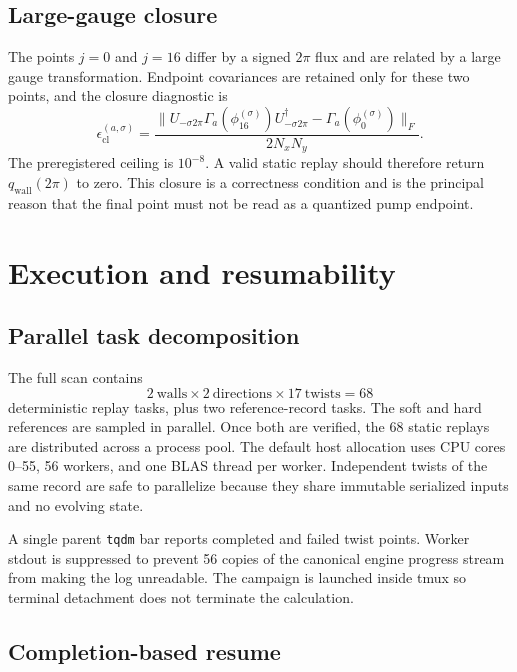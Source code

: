 \documentclass[aps,prb,twocolumn,floatfix,nofootinbib,superscriptaddress]{revtex4-2}
\newcommand{\code}[1]{\texttt{#1}}
\begin{document}
\subsection{Large-gauge closure}

The points $j=0$ and $j=16$ differ by a signed $2\pi$ flux and are related by
a large gauge transformation.  Endpoint covariances are retained only for
these two points, and the closure diagnostic is
\begin{equation}
  \epsilon_{\mathrm{cl}}^{(a,\sigma)}
  =\frac{
  \lVert
  U_{-\sigma2\pi}
  \Gamma_a(\phi_{16}^{(\sigma)})
  U_{-\sigma2\pi}^{\dagger}
  -\Gamma_a(\phi_0^{(\sigma)})
  \rVert_F}{2N_xN_y}.
  \label{eq:closure}
\end{equation}
The preregistered ceiling is $10^{-8}$.  A valid static replay should therefore
return $q_{\mathrm{wall}}(2\pi)$ to zero.  This closure is a correctness
condition and is the principal reason that the final point must not be read as
a quantized pump endpoint.

\section{Execution and resumability}

\subsection{Parallel task decomposition}

The full scan contains
\begin{equation}
  2\ \text{walls}
  \times2\ \text{directions}
  \times17\ \text{twists}
  =68
\end{equation}
deterministic replay tasks, plus two reference-record tasks.  The soft and hard
references are sampled in parallel.  Once both are verified, the 68 static
replays are distributed across a process pool.  The default host allocation
uses CPU cores 0--55, 56 workers, and one BLAS thread per worker.  Independent
twists of the same record are safe to parallelize because they share immutable
serialized inputs and no evolving state.

A single parent \code{tqdm} bar reports completed and failed twist points.
Worker stdout is suppressed to prevent 56 copies of the canonical engine
progress stream from making the log unreadable.  The campaign is launched
inside tmux so terminal detachment does not terminate the calculation.

\subsection{Completion-based resume}
\end{document}
